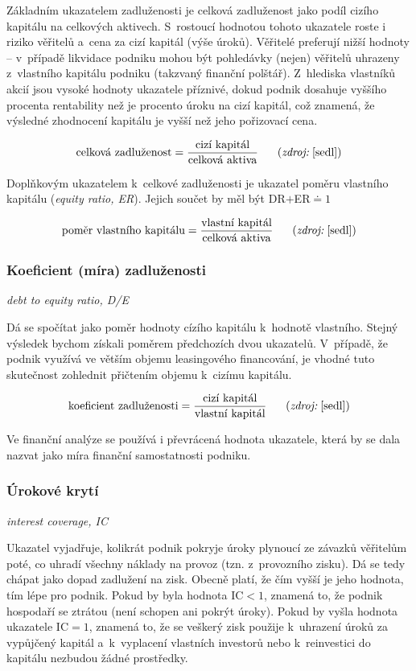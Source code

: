Základním ukazatelem zadluženosti je celková zadluženost jako podíl cizího kapitálu na celkových aktivech. S~rostoucí hodnotou tohoto ukazatele roste i riziko věřitelů a~cena za cizí kapitál (výše úroků). Věřitelé preferují nižší hodnoty -- v~případě likvidace podniku mohou být pohledávky (nejen) věřitelů uhrazeny z~vlastního kapitálu podniku (takzvaný finanční polštář).
Z~hlediska vlastníků akcií jsou vysoké hodnoty ukazatele příznivé, dokud podnik dosahuje vyššího procenta rentability než je procento úroku na cizí kapitál, což znamená, že výsledné zhodnocení kapitálu je vyšší než jeho pořizovací cena.\cite{such}

$$\vz{celková zadluženost}{cizí kapitál}{celková aktiva} \scite{sedl}$$

\vspace{3mm}
Doplňkovým ukazatelem k~celkové zadluženosti je ukazatel poměru vlastního kapitálu (\textit{equity ratio, ER}). Jejich součet by měl být DR$+$ER$
\doteq 1$

$$\vz{poměr vlastního kapitálu}{vlastní kapitál}{celková aktiva} \scite{sedl}$$

\subsubsection{Koeficient (míra) zadluženosti}
\textit{debt to equity ratio, D/E}

Dá se spočítat jako poměr hodnoty cízího kapitálu k~hodnotě vlastního. Stejný výsledek bychom získali poměrem předchozích dvou ukazatelů. V~případě, že podnik využívá ve větším objemu leasingového financování, je vhodné tuto skutečnost zohlednit přičtením objemu k~cizímu kapitálu. 

$$\vz{koeficient zadluženosti}{cizí kapitál}{vlastní kapitál} \scite{sedl}$$

\vspace{3mm}
Ve finanční analýze se používá i převrácená hodnota ukazatele, která by se dala nazvat jako míra finanční samostatnosti podniku.

\subsubsection{Úrokové krytí}
\textit{interest coverage, IC}

Ukazatel vyjadřuje, kolikrát podnik pokryje úroky plynoucí ze závazků věřitelům poté, co uhradí všechny náklady na provoz (tzn. z~provozního zisku). Dá se tedy chápat jako dopad zadlužení na zisk. Obecně platí, že čím vyšší je jeho hodnota, tím lépe pro podnik. Pokud by byla hodnota IC$<1$, znamená to, že podnik hospodaří se ztrátou (není schopen ani pokrýt úroky). Pokud by vyšla hodnota ukazatele IC$=1$, znamená to, že se veškerý zisk použije k~uhrazení úroků za vypůjčený kapitál a~k~vyplacení vlastních investorů nebo k~reinvestici do kapitálu nezbudou žádné prostředky.

